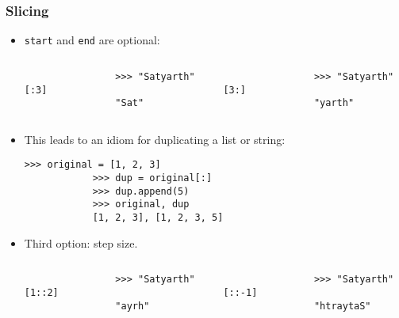 \documentclass[presentation]{beamer}
\begin{document}
	\begin{frame}[fragile]
		\frametitle{Slicing}
		
		\begin{itemize}
			\item \lstinline|start| and \lstinline|end| are optional:
			\begin{columns}[c]
				\begin{lstlisting}
				>>> "Satyarth"[:3]
				"Sat"
				\end{lstlisting}
				\begin{lstlisting}
				>>> "Satyarth"[3:]
				"yarth"
				\end{lstlisting}
			\end{columns}
			
			\pause
			
			\item This leads to an idiom for duplicating a list or string:
			\begin{lstlisting}[xleftmargin=\dimexpr-\leftmargini]
			>>> original = [1, 2, 3]
			>>> dup = original[:]
			>>> dup.append(5)
			>>> original, dup
			[1, 2, 3], [1, 2, 3, 5]
			\end{lstlisting}
			
			\pause
			
			\item Third option: step size.
			
			\begin{columns}[c]
				\begin{lstlisting}
				>>> "Satyarth"[1::2]
				"ayrh"
				\end{lstlisting}
				\begin{lstlisting}
				>>> "Satyarth"[::-1]
				"htraytaS"
				\end{lstlisting}
			\end{columns}
		\end{itemize}
		
	\end{frame}
	
\end{document}

